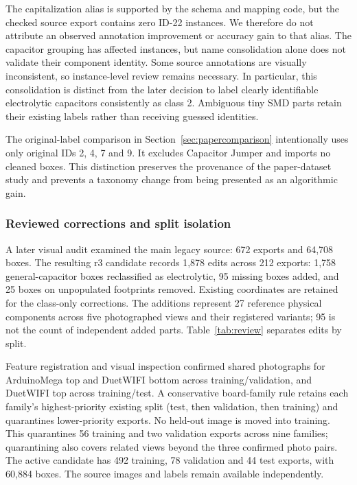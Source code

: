 The capitalization alias is supported by the schema and mapping code, but the
checked source export contains zero ID-22 instances. We therefore do not
attribute an observed annotation improvement or accuracy gain to that alias.
The capacitor grouping has affected instances, but name consolidation alone
does not validate their component identity. Some source annotations are
visually inconsistent, so instance-level review remains necessary. In particular,
this consolidation is distinct from the later decision to label clearly
identifiable electrolytic capacitors consistently as class 2. Ambiguous tiny
SMD parts retain their existing labels rather than receiving guessed identities.

The original-label comparison in Section~\ref{sec:papercomparison} intentionally uses only original
IDs 2, 4, 7 and 9. It excludes Capacitor Jumper and imports no cleaned boxes.
This distinction preserves the provenance of the paper-dataset study and
prevents a taxonomy change from being presented as an algorithmic gain.

\subsubsection{Reviewed corrections and split isolation}

A later visual audit examined the main legacy source: 672 exports and 64,708
boxes. The resulting r3 candidate records 1,878 edits across 212 exports:
1,758 general-capacitor boxes reclassified as electrolytic, 95 missing boxes
added, and 25 boxes on unpopulated footprints removed. Existing coordinates
are retained for the class-only corrections. The additions represent 27
reference physical components across five photographed views and their
registered variants; 95 is not the count of independent added parts.
Table~\ref{tab:review} separates edits by split.



Feature registration and visual inspection confirmed shared photographs for
ArduinoMega top and DuetWIFI bottom across training/validation, and DuetWIFI top
across training/test. A conservative board-family rule retains each family's
highest-priority existing split (test, then validation, then training) and
quarantines lower-priority exports. No held-out image is moved into training.
This quarantines 56 training and two validation exports across nine families;
quarantining also covers related views beyond the three confirmed photo pairs.
The active candidate has 492 training, 78 validation and 44 test exports, with
60,884 boxes. The source images and labels remain available independently.

